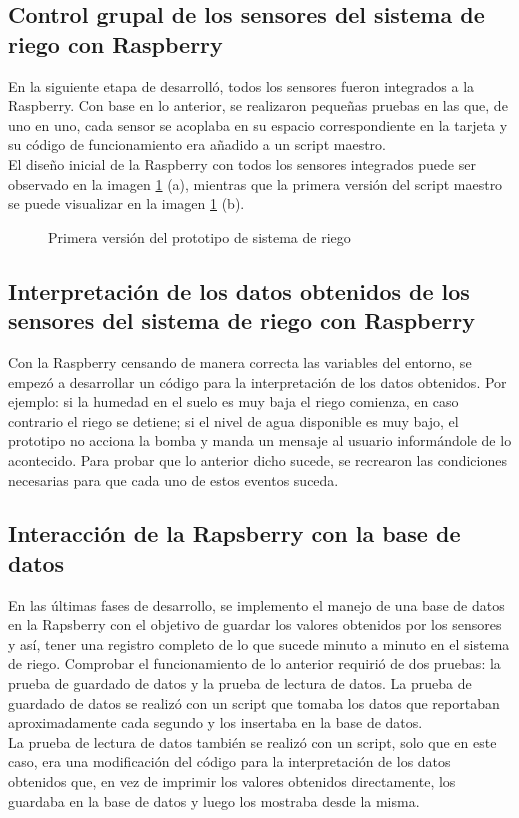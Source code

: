 \subsection{Control grupal de los sensores del sistema de riego con Raspberry}
En la siguiente etapa de desarroll\'o, todos los sensores fueron integrados a la Raspberry. Con base en lo anterior, se realizaron peque\~{n}as pruebas en las que, de uno en uno, cada sensor se acoplaba en su espacio correspondiente en la tarjeta y su c\'odigo de funcionamiento era a\~{n}adido a un script maestro.\\ 
El dise\~{n}o inicial de la Raspberry con todos los sensores integrados puede ser observado en la imagen \ref{todo} (a), mientras que la primera versi\'on del script maestro se puede visualizar en la imagen \ref{todo} (b). 
 
\begin{figure}[H]
	\begin{center}
	\end{center}
	\label{todo}
	\caption{Primera versi\'on del prototipo de sistema de riego}
\end{figure} 


\subsection{Interpretaci\'{o}n de los datos obtenidos de los sensores del sistema de riego con Raspberry}
Con la Raspberry censando de manera correcta las variables del entorno, se empez\'o a desarrollar un c\'odigo para la interpretaci\'on de los datos obtenidos. Por ejemplo: si la humedad en el suelo es muy baja el riego comienza, en caso contrario el riego se detiene; si el nivel de agua disponible es muy bajo, el prototipo no acciona la bomba y manda un mensaje al usuario inform\'andole de lo acontecido. Para probar que lo anterior dicho sucede, se recrearon las condiciones necesarias para que cada uno de estos eventos suceda.

\subsection{Interacci\'on de la Rapsberry con la base de datos}
En las \'ultimas fases de desarrollo, se implemento el manejo de una base de datos en la Rapsberry con el objetivo de guardar los valores obtenidos por los sensores y as\'i, tener una registro completo de lo que sucede minuto a minuto en el sistema de riego. Comprobar el funcionamiento de lo anterior requiri\'o de dos pruebas: la prueba de guardado de datos y la prueba de lectura de datos.
La prueba de guardado de datos se realiz\'o con un script que tomaba los datos que reportaban aproximadamente cada segundo y los insertaba en la base de datos.\\
La prueba de lectura de datos tambi\'en se realiz\'o con un script, solo que en este caso, era una modificaci\'on del c\'odigo para la interpretaci\'on de los datos obtenidos que, en vez de imprimir los valores obtenidos directamente, los guardaba en la base de datos y luego los mostraba desde la misma.

